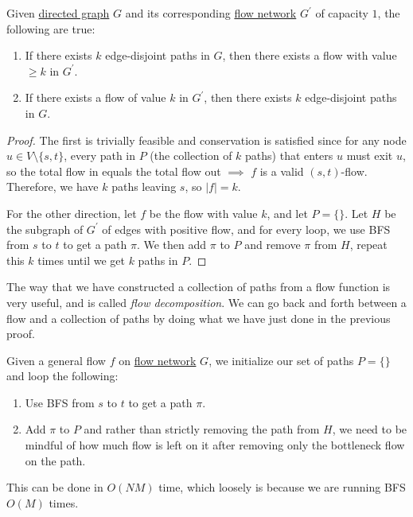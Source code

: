   \begin{theorem}
    \label{thm:edge-disjoint-paths}
    Given \hyperref[def:directed-graph]{directed graph} $G$ and its corresponding \hyperref[def:flow-network]{flow network} $G^\prime$ of capacity $1$, the following are true: 
    \begin{enumerate}
      \item If there exists $k$ edge-disjoint paths in $G$, then there exists a flow with value $\geq k$ in $G^\prime$. 
      \item If there exists a flow of value $k$ in $G^\prime$, then there exists $k$ edge-disjoint paths in $G$. 
    \end{enumerate}
  \end{theorem}
  \begin{proof}
    The first is trivially feasible and conservation is satisfied since for any node $u \in V \setminus \{s, t\}$, every path in $P$ (the collection of $k$ paths) that enters $u$ must exit $u$, so the total flow in equals the total flow out $\implies$ $f$ is a valid $(s, t)$-flow. Therefore, we have $k$ paths leaving $s$, so $|f| = k$. 

    For the other direction, let $f$ be the flow with value $k$, and let $P = \{\}$. Let $H$ be the subgraph of $G^\prime$ of edges with positive flow, and for every loop, we use BFS from $s$ to $t$ to get a path $\pi$. We then add $\pi$ to $P$ and remove $\pi$ from $H$, repeat this $k$ times until we get $k$ paths in $P$.  
  \end{proof} 

  The way that we have constructed a collection of paths from a flow function is very useful, and is called \textit{flow decomposition}. We can go back and forth between a flow and a collection of paths by doing what we have just done in the previous proof. 

  \begin{definition}
    \label{def:flow-decomposition}
    Given a general flow $f$ on \hyperref[def:flow-network]{flow network} $G$, we initialize our set of paths $P = \{\}$ and loop the following: 
    \begin{enumerate}
      \item Use BFS from $s$ to $t$ to get a path $\pi$. 
      \item Add $\pi$ to $P$ and rather than strictly removing the path from $H$, we need to be mindful of how much flow is left on it after removing only the bottleneck flow on the path. 
    \end{enumerate}
    This can be done in $O(NM)$ time, which loosely is because we are running BFS $O(M)$ times. 
  \end{definition}

